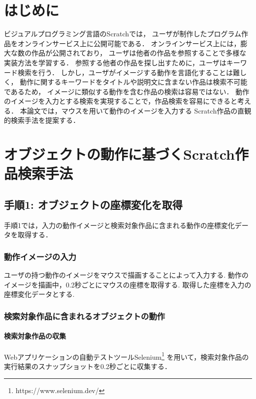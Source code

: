 \documentclass[twocolumn]{jarticle} %
\begin{document}
\maketitle
\thispagestyle{empty} %



\section{はじめに}
ビジュアルプログラミング言語のScratchでは，
ユーザが制作したプログラム作品をオンラインサービス上に公開可能である．
オンラインサービス上には，膨大な数の作品が公開されており，
ユーザは他者の作品を参照することで多様な実装方法を学習する\cite{spfa}．
参照する他者の作品を探し出すために，ユーザはキーワード検索を行う．
しかし，ユーザがイメージする動作を言語化することは難しく，
動作に関するキーワードをタイトルや説明文に含まない作品は検索不可能であるため，
イメージに類似する動作を含む作品の検索は容易ではない\cite{wild}．
動作のイメージを入力とする検索を実現することで，作品検索を容易にできると考える．
本論文では，マウスを用いて動作のイメージを入力する
Scratch作品の直観的検索手法を提案する．

\section{オブジェクトの動作に基づくScratch作品検索手法}
\subsection{手順1: オブジェクトの座標変化を取得}
手順1では，入力の動作イメージと検索対象作品に含まれる動作の座標変化データを取得する．
\subsubsection{動作イメージの入力}
ユーザの持つ動作のイメージをマウスで描画することによって入力する.
動作のイメージを描画中，0.2秒ごとにマウスの座標を取得する.
取得した座標を入力の座標変化データとする.

\subsubsection{検索対象作品に含まれるオブジェクトの動作}
\paragraph{検索対象作品の収集}
Webアプリケーションの自動テストツールSelenium\footnote{https://www.selenium.dev/}
を用いて，検索対象作品の実行結果のスナップショットを0.2秒ごとに収集する．
\end{document}
